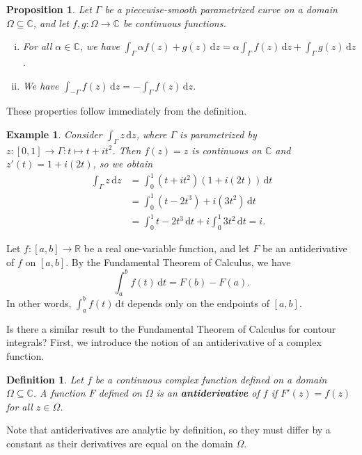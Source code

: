 \documentclass[10pt]{article}
\makeatletter
\newcommand{\R}{\mathbb{R}}
\newcommand{\C}{\mathbb{C}}
\newcommand{\dd}{\,\mathrm{d}}
\theoremstyle{newstyle}
\newtheorem{prop}[thm]{Proposition}
\newtheorem{defn}[thm]{Definition}
\newtheorem{exmp}[thm]{Example}
\newenvironment{pf}[1][\proofname]{\par
  \pushQED{\qed}%
  \normalfont \topsep0\p@\relax
  \trivlist
  \item[\hskip\labelsep\scshape
  #1\@addpunct{.}]\ignorespaces
}{%
  \popQED\endtrivlist\@endpefalse
}
\makeatother
\begin{document}
\begin{prop}
Let $\Gamma$ be a piecewise-smooth parametrized curve on a domain $\Omega \subseteq \C$, and 
let $f, g : \Omega \to \C$ be continuous functions. 
\begin{enumerate}[(i)]
    \item For all $\alpha \in \C$, we have $\int_\Gamma \alpha f(z) + g(z)\dd z = \alpha 
    \int_\Gamma f(z)\dd z + \int_\Gamma g(z)\dd z$.
    \item We have $\int_{-\Gamma} f(z)\dd z = -\int_\Gamma f(z)\dd z$. 
\end{enumerate}
\end{prop}
\begin{pf}
These properties follow immediately from the definition. 
\end{pf}

\begin{exmp}
Consider $\int_\Gamma z\dd z$, where $\Gamma$ is parametrized by $z : [0, 1] \to \Gamma : 
t \mapsto t + it^2$. Then $f(z) = z$ is continuous on $\C$ and $z'(t) = 1 + i(2t)$, so we obtain 
\begin{align*}
    \int_\Gamma z\dd z &= \int_0^1 (t + it^2)(1 + i(2t))\dd t \\
    &= \int_0^1 (t-2t^3) + i(3t^2)\dd t \\
    &= \int_0^1 t - 2t^3 \dd t + i \int_0^1 3t^2 \dd t = i.
\end{align*}
\end{exmp}

Let $f : [a, b] \to \R$ be a real one-variable function, and let $F$ be an antiderivative of $f$ 
on $[a, b]$. By the Fundamental Theorem of Calculus, we have 
\[ \int_a^b f(t)\dd t = F(b) - F(a). \]
In other words, $\int_a^b f(t)\dd t$ depends only on the endpoints of $[a, b]$. 

Is there a similar result to the Fundamental Theorem of Calculus 
for contour integrals? First, we introduce the notion of an antiderivative 
of a complex function. 

\begin{defn}
Let $f$ be a continuous complex function defined on a domain $\Omega \subseteq \C$. 
A function $F$ defined on $\Omega$ is an {\bf antiderivative} of $f$ if $F'(z) = f(z)$ for all $z 
\in \Omega$. 
\end{defn}

Note that antiderivatives are analytic by definition, so they must differ by a constant 
as their derivatives are equal on the domain $\Omega$. 
\end{document}
